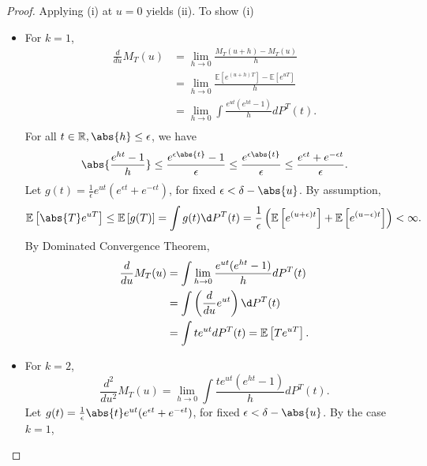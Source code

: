 \documentclass[a4paper]{article}
\begin{document}
\begin{proof}
	Applying (i) at $u = 0$ yields (ii). To show (i)
	\begin{itemize}
		\item For $k = 1$,
		\begin{equation*}
			\begin{aligned}
				\frac{d}{du}M_T(u) &= \lim\limits_{h \to 0} \frac{M_T(u+h) - M_T(u)}{h} \\
				&= \lim\limits_{h \to 0} \frac{\mathbb{E}\left[e^{(u+h)T}\right] - \mathbb{E}\left[e^{uT}\right]}{h} \\
				&= \lim\limits_{h \to 0} \int \frac{e^{ut}(e^{ht}-1)}{h}dP^T(t). \\
			\end{aligned}
		\end{equation*}
		For all  $t \in\mathbb{R}, \abs{h} \leq \epsilon$, we have
		\begin{equation*}
			\abs{\frac{e^{ht}-1}{h}} \leq \frac{e^{\epsilon\abs{t}}-1}{\epsilon} \leq \frac{e^{\epsilon\abs{t}}}{\epsilon} \leq \frac{e^{\epsilon t} + e^{-\epsilon t}}{\epsilon}.
		\end{equation*}
		Let $g(t) = \frac{1}{\epsilon} e^{ut}(e^{\epsilon t}+e^{-\epsilon t})$, for fixed $\epsilon < \delta - \abs{u}$. By assumption,
		\begin{equation*}
			\mathbb{E}\left[\abs{T}e^{uT}\right] \leq \mathbb{E}\left[g(T)\right] = \int g(t) \d P^T(t) = \frac{1}{\epsilon}\left(\mathbb{E}\left[e^{(u+\epsilon) t}\right]+\mathbb{E}\left[e^{(u-\epsilon) t}\right]\right) < \infty.
		\end{equation*}
		By Dominated Convergence Theorem, 
		\begin{equation*}
			\begin{aligned}
				\frac{d}{du}M_T(u) &= \int \lim\limits_{h \to 0} \frac{e^{ut}(e^{ht}-1)}{h}dP^T(t) \\
				&= \int \left(\frac{d}{du} e^{ut}\right)\d P^T(t) \\
				&= \int t e^{ut} d P^T(t) = \mathbb{E}\left[Te^{uT}\right].
			\end{aligned}
		\end{equation*}
		\item For $k = 2$,
		\begin{equation*}
			\frac{d^2}{du^2}M_T(u) = \lim\limits_{h \to 0} \int \frac{te^{ut}(e^{ht}-1)}{h}dP^T(t).
		\end{equation*}
		Let $g(t) = \frac{1}{\epsilon} \abs{t} e^{ut}(e^{\epsilon t}+e^{-\epsilon t})$, for fixed $\epsilon < \delta - \abs{u}$. By the case $k = 1$,

\end{itemize}
\end{proof}
\end{document}
